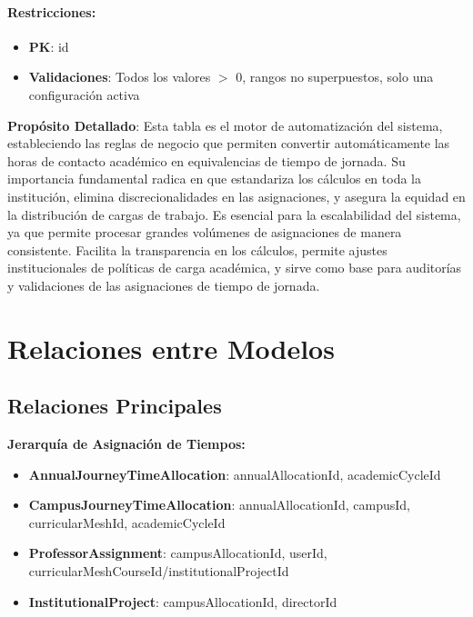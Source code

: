 \documentclass[11pt,a4paper]{article}
\begin{document}
\paragraph{Restricciones:}
\begin{itemize}
    \item \textbf{PK}: id
    \item \textbf{Validaciones}: Todos los valores $>$ 0, rangos no superpuestos, solo una configuración activa
\end{itemize}

\textbf{Propósito Detallado}: Esta tabla es el motor de automatización del sistema, estableciendo las reglas de negocio que permiten convertir automáticamente las horas de contacto académico en equivalencias de tiempo de jornada. Su importancia fundamental radica en que estandariza los cálculos en toda la institución, elimina discrecionalidades en las asignaciones, y asegura la equidad en la distribución de cargas de trabajo. Es esencial para la escalabilidad del sistema, ya que permite procesar grandes volúmenes de asignaciones de manera consistente. Facilita la transparencia en los cálculos, permite ajustes institucionales de políticas de carga académica, y sirve como base para auditorías y validaciones de las asignaciones de tiempo de jornada.

\newpage

\section{Relaciones entre Modelos}

\subsection{Relaciones Principales}

\textbf{Jerarquía de Asignación de Tiempos:}
\begin{itemize}
    \item \textbf{AnnualJourneyTimeAllocation}: annualAllocationId, academicCycleId
    \item \textbf{CampusJourneyTimeAllocation}: annualAllocationId, campusId, curricularMeshId, academicCycleId
    \item \textbf{ProfessorAssignment}: campusAllocationId, userId, curricularMeshCourseId/institutionalProjectId
    \item \textbf{InstitutionalProject}: campusAllocationId, directorId
\end{itemize}
\end{document}
